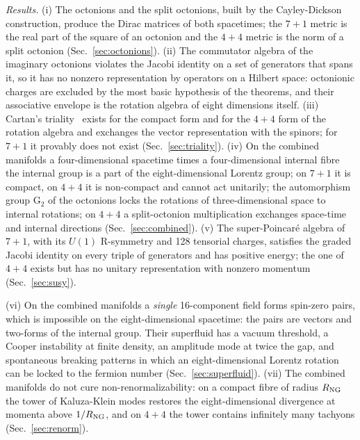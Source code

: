 \emph{Results.} (i) The octonions and the split octonions, built by the Cayley-Dickson
construction, produce the Dirac matrices of both spacetimes; the $7+1$ metric is the real part of
the square of an octonion and the $4+4$ metric is the norm of a split octonion
(Sec.~\ref{sec:octonions}). (ii) The commutator algebra of the imaginary octonions violates the
Jacobi identity on a set of generators that spans it, so it has no nonzero representation by
operators on a Hilbert space: octonionic charges are excluded by the most basic hypothesis of the
theorems, and their associative envelope is the rotation algebra of eight dimensions itself.
(iii) Cartan's triality~\cite{Cartan1925} exists for the compact form and for the $4+4$ form of the
rotation algebra and exchanges the vector representation with the spinors; for $7+1$ it provably does
not exist (Sec.~\ref{sec:triality}). (iv) On the combined manifolds a four-dimensional spacetime
times a four-dimensional internal fibre the internal group is a part of the eight-dimensional Lorentz
group; on $7+1$ it is compact, on $4+4$ it is non-compact and cannot act unitarily; the automorphism
group $\mathrm G_2$ of the octonions locks the rotations of three-dimensional space to internal
rotations; on $4+4$ a split-octonion multiplication exchanges space-time and internal directions
(Sec.~\ref{sec:combined}). (v) The super-Poincar\'e algebra of $7+1$, with its $U(1)$ R-symmetry
and 128 tensorial charges, satisfies the graded Jacobi identity on every triple of generators and
has positive energy; the one of $4+4$ exists but has no unitary representation with nonzero momentum
(Sec.~\ref{sec:susy}).

(vi) On the combined manifolds a \emph{single} 16-component field forms spin-zero pairs, which is
impossible on the eight-dimensional spacetime: the pairs are vectors and two-forms of the internal
group. Their superfluid has a vacuum threshold, a Cooper instability at finite density, an amplitude
mode at twice the gap, and spontaneous breaking patterns in which an eight-dimensional Lorentz
rotation can be locked to the fermion number (Sec.~\ref{sec:superfluid}). (vii) The combined
manifolds do not cure non-renormalizability: on a compact fibre of radius $R_{\rm NG}$ the tower of
Kaluza-Klein modes restores the eight-dimensional divergence at momenta above $1/R_{\rm NG}$, and on
$4+4$ the tower contains infinitely many tachyons (Sec.~\ref{sec:renorm}).

